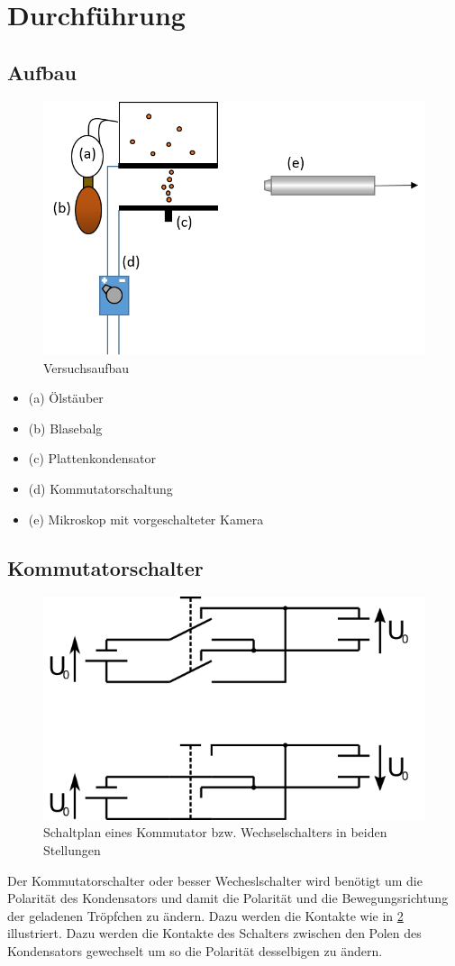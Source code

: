 \documentclass{scrartcl}
\begin{document}
            \section{Durchführung}
	\subsection{Aufbau}
		\begin{figure}[H]
			\centering
			\includegraphics[width=1.0\textwidth]{Versuchsaufbau2.PNG}
			\caption{Versuchsaufbau \cite{aufbau}}
			\label{versuchsaufbau}

		\end{figure}
		\begin{itemize}
			\item (a) Ölstäuber
			\item (b) Blasebalg 
			\item (c) Plattenkondensator
			\item (d) Kommutatorschaltung
			\item (e) Mikroskop mit vorgeschalteter Kamera
		\end{itemize}
	\subsection{Kommutatorschalter}
		\begin{figure}[H]
			\centering
			\includegraphics[width=.5\textwidth]{kommutator.png} 
			\caption{Schaltplan eines Kommutator bzw. Wechselschalters in beiden Stellungen}
			\label{kommutator} 
		\end{figure}
		Der Kommutatorschalter oder besser Wecheslschalter wird benötigt um die Polarität des Kondensators und damit die Polarität
		und die Bewegungsrichtung der geladenen Tröpfchen zu ändern. Dazu werden die Kontakte wie in \ref{kommutator} illustriert.
		Dazu werden die Kontakte des Schalters zwischen den Polen des Kondensators gewechselt um so die Polarität desselbigen zu ändern.
\end{document}
